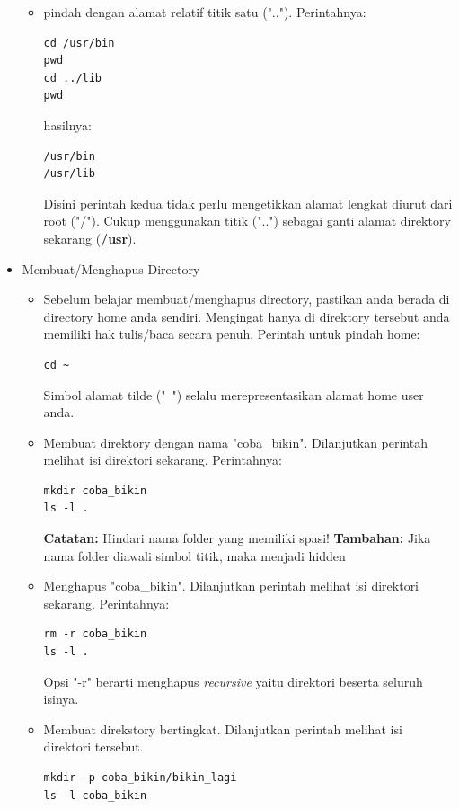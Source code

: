 \documentclass[12pt,]{article}
\begin{document}
\begin{itemize}
\begin{itemize}
			\item pindah dengan alamat relatif titik satu ("..").
			Perintahnya:
			\begin{verbatim}
cd /usr/bin
pwd
cd ../lib
pwd
			\end{verbatim}
			hasilnya:
			\begin{verbatim}
/usr/bin
/usr/lib
			\end{verbatim}
			Disini perintah kedua tidak perlu mengetikkan alamat lengkat diurut dari root ("/").
			Cukup menggunakan titik ("..") sebagai ganti alamat direktory sekarang (\textbf{/usr}).
						
		\end{itemize}
	
		\item Membuat/Menghapus Directory
		\begin{itemize}
			\item Sebelum belajar membuat/menghapus directory, pastikan anda berada di directory home anda sendiri.
			Mengingat hanya di direktory tersebut anda memiliki hak tulis/baca secara penuh.
			Perintah untuk pindah home:
			\begin{verbatim}
cd ~
			\end{verbatim}
			Simbol alamat tilde ("~") selalu merepresentasikan alamat home user anda.
			
			\item Membuat direktory dengan nama "coba\_bikin".
			Dilanjutkan perintah melihat isi direktori sekarang.
			Perintahnya:
			\begin{verbatim}
mkdir coba_bikin
ls -l .
			\end{verbatim}
			\textbf{Catatan:} Hindari nama folder yang memiliki spasi!
			\textbf{Tambahan:} Jika nama folder diawali simbol titik, maka menjadi hidden
			
			\item Menghapus "coba\_bikin".
			Dilanjutkan perintah melihat isi direktori sekarang.
			Perintahnya:
			\begin{verbatim}
rm -r coba_bikin
ls -l .
			\end{verbatim}
			Opsi "-r" berarti menghapus \textit{recursive} yaitu direktori beserta seluruh isinya.
			
			\item Membuat direkstory bertingkat.
			Dilanjutkan perintah melihat isi direktori tersebut.
			\begin{verbatim}
mkdir -p coba_bikin/bikin_lagi
ls -l coba_bikin
			\end{verbatim}
			

\end{itemize}
\end{itemize}
\end{document}
